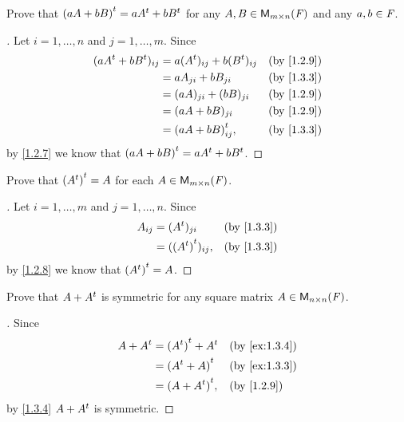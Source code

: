 \exercisesection

\setcounter{ex}{2}
\begin{ex}\label{ex:1.3.3}
	Prove that \({(aA + bB)}^{t} = a{A}^{t} + b{B}^{t}\) for any \(A, B \in \mathsf{M}_{{m} \times n}({\mathit{F}})\) and any \(a, b \in \mathit{F}\).
\end{ex}

\begin{proof}[]
	Let \(i = 1, \dots, n\) and \(j = 1, \dots, m\).
	Since
	\begin{align*}
		(a\tp{A} + b\tp{B})_{i j} & = a(\tp{A})_{i j} + b(\tp{B})_{i j} &  & \by{1.2.9} \\
		                          & = aA_{j i} + bB_{j i}               &  & \by{1.3.3} \\
		                          & = (aA)_{j i} + (bB)_{j i}           &  & \by{1.2.9} \\
		                          & = (aA + bB)_{j i}                   &  & \by{1.2.9} \\
		                          & = \tp{(aA + bB)}_{i j},             &  & \by{1.3.3}
	\end{align*}
	by \cref{1.2.7} we know that \({(aA + bB)}^{t} = a{A}^{t} + b{B}^{t}\).
\end{proof}

\begin{ex}\label{ex:1.3.4}
	Prove that \({({A}^{t})}^{t} = A\) for each \(A \in \mathsf{M}_{{m} \times n}({\mathit{F}})\).
\end{ex}

\begin{proof}[]
	Let \(i = 1, \dots, m\) and \(j = 1, \dots, n\).
	Since
	\begin{align*}
		A_{i j} & = (\tp{A})_{j i}         &  & \by{1.3.3} \\
		        & = (\tp{(\tp{A})})_{i j}, &  & \by{1.3.3}
	\end{align*}
	by \cref{1.2.8} we know that \({({A}^{t})}^{t} = A\).
\end{proof}

\begin{ex}\label{ex:1.3.5}
	Prove that \(A + {A}^{t}\) is symmetric for any square matrix \(A \in \mathsf{M}_{{n} \times n}({\mathit{F}})\).
\end{ex}

\begin{proof}[]
	Since
	\begin{align*}
		A + \tp{A} & = \tp{(\tp{A})} + \tp{A} &  & \by{ex:1.3.4} \\
		           & = \tp{(\tp{A} + A)}      &  & \by{ex:1.3.3} \\
		           & = \tp{(A + \tp{A})},     &  & \by{1.2.9}
	\end{align*}
	by \cref{1.3.4} \(A + {A}^{t}\) is symmetric.
\end{proof}

